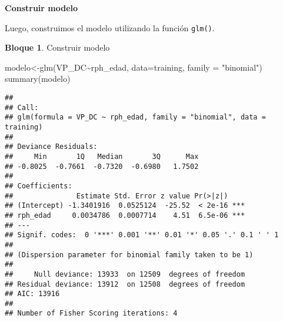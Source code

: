 \documentclass[
]{book}
\newenvironment{Shaded}{\begin{snugshade}}{\end{snugshade}}
\newcommand{\AttributeTok}[1]{\textcolor[rgb]{0.77,0.63,0.00}{#1}}
\newcommand{\DecValTok}[1]{\textcolor[rgb]{0.00,0.00,0.81}{#1}}
\newcommand{\FunctionTok}[1]{\textcolor[rgb]{0.00,0.00,0.00}{#1}}
\newcommand{\NormalTok}[1]{#1}
\newcommand{\OtherTok}[1]{\textcolor[rgb]{0.56,0.35,0.01}{#1}}
\newcommand{\SpecialCharTok}[1]{\textcolor[rgb]{0.00,0.00,0.00}{#1}}
\newcommand{\StringTok}[1]{\textcolor[rgb]{0.31,0.60,0.02}{#1}}
\theoremstyle{definition}
\theoremstyle{definition}
\newtheorem{example}{Bloque}[chapter]
\theoremstyle{definition}
\theoremstyle{definition}
\theoremstyle{remark}
\begin{document}
\begin{Shaded}
\end{Shaded}

\textbf{Construir modelo}

Luego, construimos el modelo utilizando la función \texttt{glm()}.

\begin{example}
\protect\hypertarget{exm:bloque16nbm}{}\label{exm:bloque16nbm}Construir modelo
\end{example}

\begin{Shaded}
\begin{Highlighting}[]
\NormalTok{modelo}\OtherTok{\textless{}{-}}\FunctionTok{glm}\NormalTok{(VP\_DC}\SpecialCharTok{\textasciitilde{}}\NormalTok{rph\_edad, }
            \AttributeTok{data=}\NormalTok{training, }
            \AttributeTok{family =} \StringTok{"binomial"}\NormalTok{)}
\FunctionTok{summary}\NormalTok{(modelo)}
\end{Highlighting}
\end{Shaded}

\begin{verbatim}
## 
## Call:
## glm(formula = VP_DC ~ rph_edad, family = "binomial", data = training)
## 
## Deviance Residuals: 
##     Min       1Q   Median       3Q      Max  
## -0.8025  -0.7661  -0.7320  -0.6980   1.7502  
## 
## Coefficients:
##               Estimate Std. Error z value Pr(>|z|)    
## (Intercept) -1.3401916  0.0525124  -25.52  < 2e-16 ***
## rph_edad     0.0034786  0.0007714    4.51  6.5e-06 ***
## ---
## Signif. codes:  0 '***' 0.001 '**' 0.01 '*' 0.05 '.' 0.1 ' ' 1
## 
## (Dispersion parameter for binomial family taken to be 1)
## 
##     Null deviance: 13933  on 12509  degrees of freedom
## Residual deviance: 13912  on 12508  degrees of freedom
## AIC: 13916
## 
## Number of Fisher Scoring iterations: 4
\end{verbatim}
\end{document}
